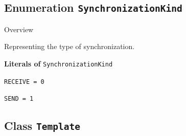 \subsection{Enumeration \bfseries \texttt{SynchronizationKind}\normalfont}
\label{cls:uppaal::templates::SynchronizationKind} 

	\begin{longdescription}
		\item[Overview] 		
				

	

		Representing the type of synchronization.		
	
		\item[\textbf{Literals of} \texttt{SynchronizationKind}] ~
		\begin{longdescription}
			
\item[\texttt{RECEIVE = 0}] ~
\nopagebreak

\item[\texttt{SEND = 1}] ~
\nopagebreak
		\end{longdescription}
	\end{longdescription}
	
	

\subsection{Class \bfseries \texttt{Template}\normalfont}
\label{cls:uppaal::templates::Template} 
	
